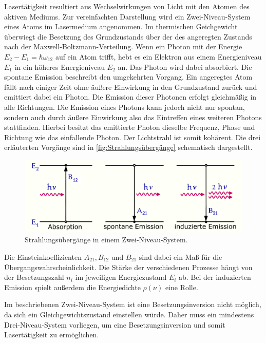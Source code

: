 Lasertätigkeit resultiert aus Wechselwirkungen von Licht mit den Atomen des aktiven Mediums.
Zur vereinfachten Darstellung wird ein Zwei-Niveau-System eines Atoms im Lasermedium angenommen.
Im thermischen Geichgewicht überwiegt die Besetzung des Grundzustands über der des angeregten Zustands nach der Maxwell-Boltzmann-Verteilung.
Wenn ein Photon mit der Energie $E_2-E_1 =\hbar \omega_{12}$ auf ein Atom trifft, hebt es ein Elektron aus einem Energieniveau $E_1$ in ein höheres
Energieniveau $E_2$ an. Das Photon wird dabei absorbiert.
Die spontane Emission beschreibt den umgekehrten Vorgang. Ein angeregtes Atom fällt nach einiger Zeit ohne äußere Einwirkung in den Grundzustand zurück
und emittiert dabei ein Photon. Die Emission dieser Photonen erfolgt gleichmäßig in alle Richtungen.
Die Emission eines Photons kann jedoch nicht nur spontan, sondern auch durch äußere Einwirkung also das Eintreffen eines weiteren Photons
stattfinden. Hierbei besitzt das emittierte Photon dieselbe Frequenz, Phase und Richtung wie das einfallende Photon.
Der Lichtstrahl ist somit kohärent.
Die drei erläuterten Vorgänge sind in \autoref{fig:Strahlungsübergänge} schematisch dargestellt.\\

\begin{figure}[H]
    \centering
    \includegraphics[scale=0.7]{Abbildungen/Prozesse.png}
    \caption{Strahlungsübergänge in einem Zwei-Niveau-System.\cite{prozess}}
    \label{fig:Strahlungsübergänge}
\end{figure}
Die Einsteinkoeffizienten $A_{21}, B_{12}$ und $B_{21}$ sind dabei ein Maß für die Übergangswahrscheinlichkeit.
Die Stärke der verschiedenen Prozesse hängt von der Besetzungszahl $n_i$ im jeweiligen Energiezustand $E_i$ ab.
Bei der induzierten Emission spielt außerdem die Energiedichte $\rho(\nu)$ eine Rolle.

Im beschriebenen Zwei-Niveau-System ist eine Besetzungsinversion nicht möglich, da sich ein Gleichgewichtszustand einstellen würde.
Daher muss ein mindestens Drei-Niveau-System vorliegen, um eine Besetzungsinversion und somit Lasertätigkeit zu ermöglichen.

